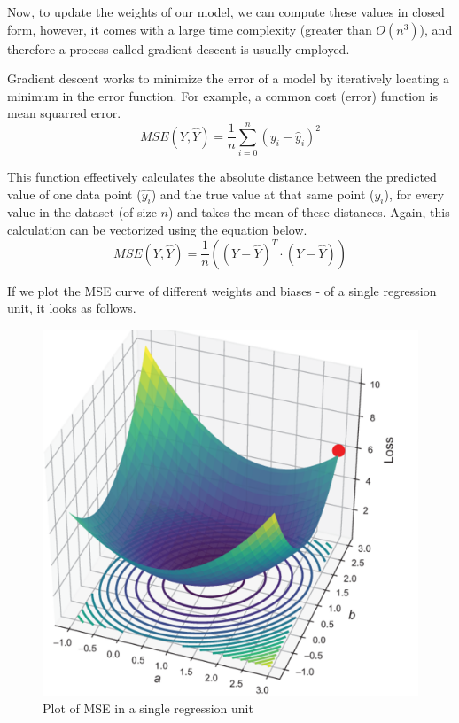 \documentclass{article}
\begin{document}
    Now, to update the weights of our model, we can compute these values in closed form, however, it comes with a large time complexity (greater than $O(n^3)$), and therefore
    a process called gradient descent is usually employed.

    Gradient descent works to minimize the error of a model by iteratively locating a minimum in the error function.
    For example, a common cost (error) function is mean squarred error.
    \begin{displaymath}
        MSE(Y, \hat{Y}) = \frac{1}{n}\sum_{i=0}^{n}\left(y_i - \hat{y}_i\right)^2
    \end{displaymath}

    This function effectively calculates the absolute distance between the predicted value of one data point ($\hat{y_i}$) and the true value at that same point ($y_i$),
    for every value in the dataset (of size $n$) and takes the mean of these distances.
    Again, this calculation can be vectorized using the equation below.
    \begin{displaymath}
        MSE(Y, \hat{Y}) = \frac{1}{n}((Y - \hat{Y})^T \cdot (Y - \hat{Y}))
    \end{displaymath}

    If we plot the MSE curve of different weights and biases - of a single regression unit, it looks as follows.
    \begin{figure}[h]
        \centering
        \includegraphics[scale=0.5]{MSEplot.png}
        \caption{Plot of MSE in a single regression unit}
    \end{figure}
\end{document}
